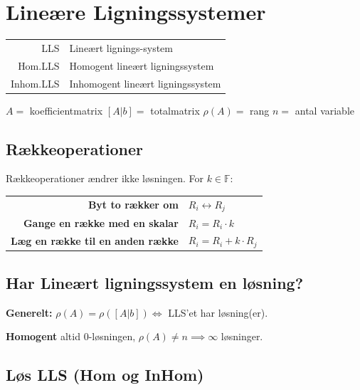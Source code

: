 \section{Lineære Ligningssystemer}

\begin{center}
    \begin{tabular}{r | l}
        LLS & Lineært lignings-system \\
        Hom.LLS & Homogent lineært ligningssystem \\
        Inhom.LLS & Inhomogent lineært ligningssystem \\
    \end{tabular}

    $A =$ koefficientmatrix \hfill $[A|b] =$ totalmatrix \hfill $\rho(A) =$ rang \hfill $n =$ antal variable
\end{center}

\subsection{Rækkeoperationer}
Rækkeoperationer ændrer ikke løsningen. For $k \in \mathbb{F}$:

\begin{center}
    \begin{tabular}{r|l}
        \textbf{Byt to rækker om} & $R_i \leftrightarrow R_j$ \\
        \textbf{Gange en række med en skalar} & $R_i = R_i \cdot k$ \\
        \textbf{Læg en række til en anden række} & $R_i = R_i + k \cdot R_j$ \\
    \end{tabular}
\end{center}

\subsection{Har Lineært ligningssystem en løsning?}

\textbf{Generelt:} $\rho(A) = \rho([A|b]) \iff$ LLS'et har løsning(er).

\textbf{Homogent} altid 0-løsningen, $\rho(A) \ne n \implies \infty$ løsninger.

\subsection{Løs LLS (Hom og InHom)}
\label{sec:LLS-løsning}

